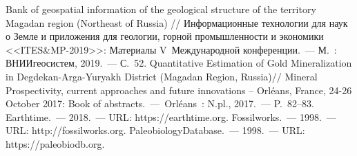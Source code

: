 \begin{thebibliography}{99}
\bibitem{} Bank of geospatial information of the geological structure of the territory Magadan region (Northeast of Russia) // Информационные технологии для наук о Земле и приложения для геологии, горной промышленности и экономики <<ITES\&MP-2019>>: Материалы V~Международной конференции.~--- М.~: ВНИИгеосистем, 2019.~--- С.~52.
\bibitem{} Quantitative Estimation of Gold Mineralization in Degdekan-Arga-Yuryakh District (Magadan Region, Russia)// Mineral Prospectivity, current approaches and future innovations -- Orléans, France, 24-26 October 2017: Book of abstracts.~--- Orléans~: N.pl., 2017.~--- P.~82--83.
\bibitem{}Earthtime.~--- 2018.~--- URL: https://earthtime.org.
\bibitem{}Fossilworks.~--- 1998.~--- URL: http://fossilworks.org.
\bibitem{}PaleobiologyDatabase.~--- 1998.~--- URL: https://paleobiodb.org.

\end{thebibliography}
\thispagestyle{empty}
